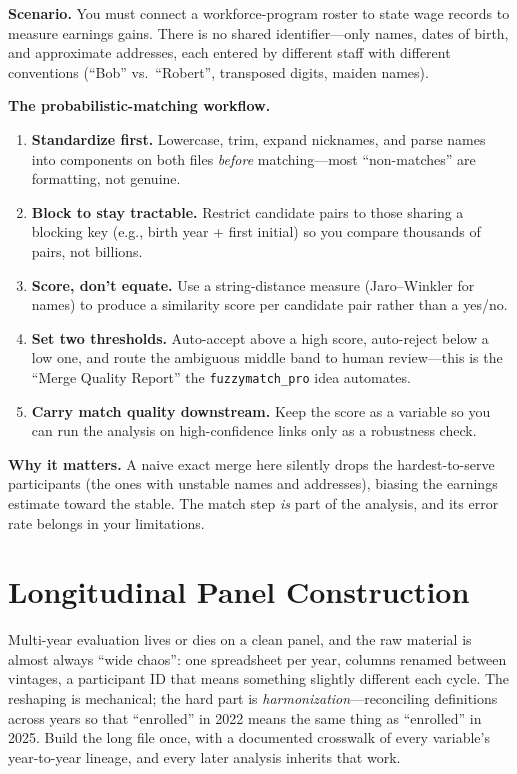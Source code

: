\documentclass[
    a4paper,
    fontsize=10pt,
    twoside=true,
    numbers=noenddot,
]{kaobook}
\newcounter{appliedexample}
\newenvironment{appliedexample}[1][]{%
    \refstepcounter{appliedexample}%
    \begin{appliedexamplebox}[frametitle={Applied Example~\theappliedexample.~~#1}]%
}{%
    \end{appliedexamplebox}%
}
\begin{document}
\begin{appliedexample}[Linking Two Agency Files With No Common ID]
\textbf{Scenario.} You must connect a workforce-program roster to state wage records to measure earnings gains. There is no shared identifier---only names, dates of birth, and approximate addresses, each entered by different staff with different conventions (\enquote{Bob} vs.\ \enquote{Robert}, transposed digits, maiden names).

\medskip
\textbf{The probabilistic-matching workflow.}
\begin{enumerate}
    \item \textbf{Standardize first.} Lowercase, trim, expand nicknames, and parse names into components on both files \emph{before} matching---most \enquote{non-matches} are formatting, not genuine.
    \item \textbf{Block to stay tractable.} Restrict candidate pairs to those sharing a blocking key (e.g., birth year + first initial) so you compare thousands of pairs, not billions.
    \item \textbf{Score, don't equate.} Use a string-distance measure (Jaro--Winkler for names) to produce a similarity score per candidate pair rather than a yes/no.
    \item \textbf{Set two thresholds.} Auto-accept above a high score, auto-reject below a low one, and route the ambiguous middle band to human review---this is the \enquote{Merge Quality Report} the \texttt{fuzzymatch\_pro} idea automates.
    \item \textbf{Carry match quality downstream.} Keep the score as a variable so you can run the analysis on high-confidence links only as a robustness check.
\end{enumerate}

\medskip
\textbf{Why it matters.} A naive exact merge here silently drops the hardest-to-serve participants (the ones with unstable names and addresses), biasing the earnings estimate toward the stable. The match step \emph{is} part of the analysis, and its error rate belongs in your limitations.
\end{appliedexample}

\section{Longitudinal Panel Construction}
Multi-year evaluation lives or dies on a clean panel, and the raw material is almost always \enquote{wide chaos}: one spreadsheet per year, columns renamed between vintages, a participant ID that means something slightly different each cycle. The reshaping is mechanical; the hard part is \emph{harmonization}---reconciling definitions across years so that \enquote{enrolled} in 2022 means the same thing as \enquote{enrolled} in 2025. Build the long file once, with a documented crosswalk of every variable's year-to-year lineage, and every later analysis inherits that work.
\end{document}

